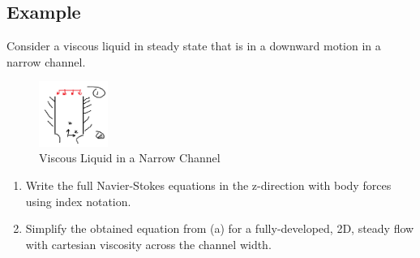 \subsection*{Example}
Consider a viscous liquid in steady state that is in a downward motion in a narrow channel. 
\begin{figure}[h]
    \centering
    \includegraphics[width=0.2\textwidth]{Lecture Number/Figures/example 1, Feb 1, 2024.png}
    \caption{Viscous Liquid in a Narrow Channel}
    \label{fig:Example 1, Feb 1, 2024}
\end{figure}
\begin{enumerate}[label=(\alph*)]
    \item Write the full Navier-Stokes equations in the z-direction with body forces using index notation.
    \item Simplify the obtained equation from (a) for a fully-developed, 2D, steady flow with cartesian viscosity across the channel width. 
\end{enumerate}

